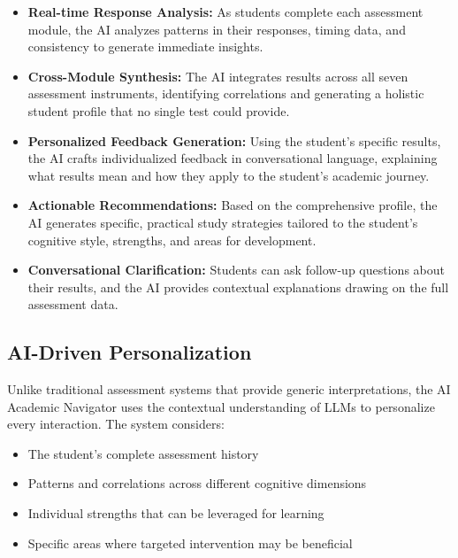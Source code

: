 \documentclass[11pt,a4paper]{article}
\begin{document}
\begin{itemize}[noitemsep]
    \item \textbf{Real-time Response Analysis:} As students complete each assessment module, the AI analyzes patterns in their responses, timing data, and consistency to generate immediate insights.

    \item \textbf{Cross-Module Synthesis:} The AI integrates results across all seven assessment instruments, identifying correlations and generating a holistic student profile that no single test could provide.

    \item \textbf{Personalized Feedback Generation:} Using the student's specific results, the AI crafts individualized feedback in conversational language, explaining what results mean and how they apply to the student's academic journey.

    \item \textbf{Actionable Recommendations:} Based on the comprehensive profile, the AI generates specific, practical study strategies tailored to the student's cognitive style, strengths, and areas for development.

    \item \textbf{Conversational Clarification:} Students can ask follow-up questions about their results, and the AI provides contextual explanations drawing on the full assessment data.
\end{itemize}

\subsection{AI-Driven Personalization}

Unlike traditional assessment systems that provide generic interpretations, the AI Academic Navigator uses the contextual understanding of LLMs to personalize every interaction. The system considers:

\begin{itemize}[noitemsep]
    \item The student's complete assessment history
    \item Patterns and correlations across different cognitive dimensions
    \item Individual strengths that can be leveraged for learning
    \item Specific areas where targeted intervention may be beneficial
\end{itemize}
\end{document}
